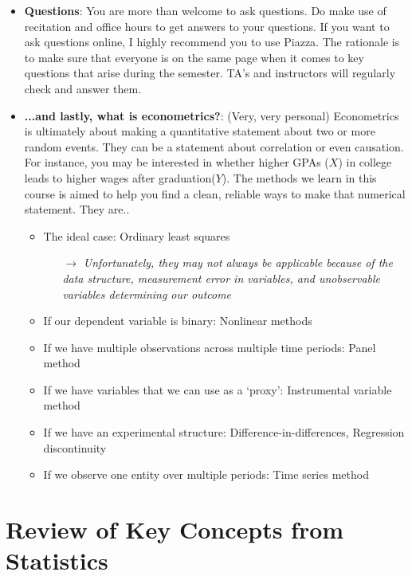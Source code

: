 \documentclass[12pt]{article}
\theoremstyle{definition}
\theoremstyle{property}
\theoremstyle{assumption}
\theoremstyle{example}
\theoremstyle{comment}
\begin{document}
\begin{itemize}
\item \textbf{Questions}: You are more than welcome to ask questions. Do make use of recitation and office hours to get answers to your questions. If you want to ask questions online, I highly recommend you to use Piazza. The rationale is to make sure that everyone is on the same page when it comes to key questions that arise during the semester. TA's and instructors will regularly check and answer them.


\item \textbf{...and lastly, what is econometrics?}: (Very, very personal) Econometrics is ultimately about making a quantitative statement about two or more random events. They can be a statement about correlation or even causation. For instance, you may be interested in whether higher GPAs ($X$) in college leads to higher wages after graduation($Y$). The methods we learn in this course is aimed to help you find a clean, reliable ways to make that numerical statement. They are..
\begin{itemize}
\item The ideal case: Ordinary least squares
\begin{itemize}
\item[$\to$]  \textit{Unfortunately, they may not always be applicable because of the data structure, measurement error in variables, and unobservable variables determining our outcome}
\end{itemize}
\item If our dependent variable is binary: Nonlinear methods
\item If we have multiple observations across multiple time periods: Panel method
\item If we have variables that we can use as a `proxy': Instrumental variable method
\item If we have an experimental structure: Difference-in-differences, Regression discontinuity
\item If we observe one entity over multiple periods: Time series method
\end{itemize}
\end{itemize}

\section{Review of Key Concepts from Statistics}
\end{document}
